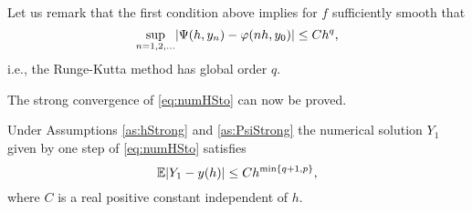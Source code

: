 \documentclass{siamart1116}
\numberwithin{theorem}{section}
\DeclarePairedDelimiter{\abs}{\lvert}{\rvert}
\renewcommand{\phi}{\varphi}
\newcommand{\E}{\operatorname{\mathbb{E}}}
\begin{document}
\begin{remark} Let us remark that the first condition above implies for $f$ sufficiently smooth that
	\begin{equation}
		\sup_{n = 1, 2, \ldots} \abs{\Psi(h, y_n) - \phi(nh, y_0)} \leq Ch^{q},
	\end{equation}
	i.e., the Runge-Kutta method has global order $q$.
\end{remark}
\noindent The strong convergence of \eqref{eq:numHSto} can now be proved. 
\begin{theorem} Under Assumptions \ref{as:hStrong} and \ref{as:PsiStrong} the numerical solution $Y_1$ given by one step of \eqref{eq:numHSto} satisfies 
	\begin{equation}
	\E\abs{Y_1 - y(h)} \leq C h^{\min\{q + 1, p\}},
	\end{equation}
	where $C$ is a real positive constant independent of $h$.
\end{theorem}
\end{document}
